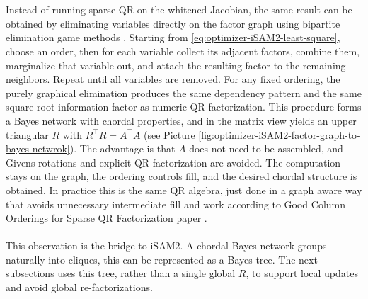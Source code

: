 \\ \\
Instead of running sparse QR on the whitened Jacobian, the same result can be obtained by eliminating variables directly on the factor graph using bipartite elimination game methods \cite{QR_factorization}. Starting from \eqref{eq:optimizer-iSAM2-least-square}, choose an order, then for each variable collect its adjacent factors, combine them, marginalize that variable out, and attach the resulting factor to the remaining neighbors. Repeat until all variables are removed. For any fixed ordering, the purely graphical elimination produces the same dependency pattern and the same square root information factor as numeric QR factorization. This procedure forms a Bayes network with chordal properties, and in the matrix view yields an upper triangular $R$ with $R^\top R = A^\top A$ (see Picture \ref{fig:optimizer-iSAM2-factor-graph-to-bayes-netwrok}). The advantage is that $A$ does not need to be assembled, and Givens rotations and explicit QR factorization are avoided. The computation stays on the graph, the ordering controls fill, and the desired chordal structure is obtained. In practice this is the same QR algebra, just done in a graph aware way that avoids unnecessary intermediate fill and work according to Good Column Orderings for Sparse QR Factorization paper \cite{QR_factorization}.
\\ \\
This observation is the bridge to iSAM2. A chordal Bayes network groups naturally into cliques, this can be represented as a Bayes tree. The next subsections uses this tree, rather than a single global $R$, to support local updates and avoid global re-factorizations.




